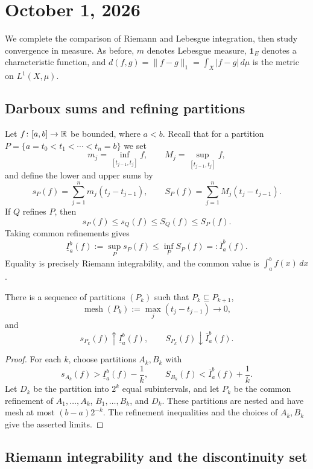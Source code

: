 \section{October 1, 2026}

We complete the comparison of Riemann and Lebesgue integration, then
study convergence in measure. As before, $m$ denotes Lebesgue measure,
$\mathbf 1_E$ denotes a characteristic function, and
$d(f,g)=\|f-g\|_1=\int_X|f-g|\,d\mu$ is the metric on
$L^1(X,\mu)$.

\subsection{Darboux sums and refining partitions}

Let $f\colon[a,b]\to\mathbb{R}$ be bounded, where $a<b$. Recall that for
a partition $P=\{a=t_0<t_1<\cdots<t_n=b\}$ we set
\[
  m_j=\inf_{[t_{j-1},t_j]}f,\qquad
  M_j=\sup_{[t_{j-1},t_j]}f,
\]
and define the lower and upper sums by
\[
  s_P(f)=\sum_{j=1}^n m_j(t_j-t_{j-1}),\qquad
  S_P(f)=\sum_{j=1}^n M_j(t_j-t_{j-1}).
\]
If $Q$ refines $P$, then
\[
  s_P(f)\leq s_Q(f)\leq S_Q(f)\leq S_P(f).
\]
Taking common refinements gives
\[
  \underline I_a^b(f):=\sup_P s_P(f)
    \leq\inf_P S_P(f)=:\overline I_a^b(f).
\]
Equality is precisely Riemann integrability, and the common value is
$\int_a^b f(x)\,dx$.

\begin{lemma}\label{lem:refining-partitions-oct-01}
  There is a sequence of partitions $(P_k)$ such that
  $P_k\subseteq P_{k+1}$,
  \[
    \operatorname{mesh}(P_k)
      :=\max_j(t_j-t_{j-1})\longrightarrow0,
  \]
  and
  \[
    s_{P_k}(f)\uparrow\underline I_a^b(f),\qquad
    S_{P_k}(f)\downarrow\overline I_a^b(f).
  \]
\end{lemma}

\begin{proof}
  For each $k$, choose partitions $A_k,B_k$ with
  \[
    s_{A_k}(f)>\underline I_a^b(f)-\frac1k,\qquad
    S_{B_k}(f)<\overline I_a^b(f)+\frac1k.
  \]
  Let $D_k$ be the partition into $2^k$ equal subintervals, and let
  $P_k$ be the common refinement of $A_1,\ldots,A_k$,
  $B_1,\ldots,B_k$, and $D_k$. These partitions are nested and have
  mesh at most $(b-a)2^{-k}$. The refinement inequalities and the
  choices of $A_k,B_k$ give the asserted limits.
\end{proof}

\subsection{Riemann integrability and the discontinuity set}

